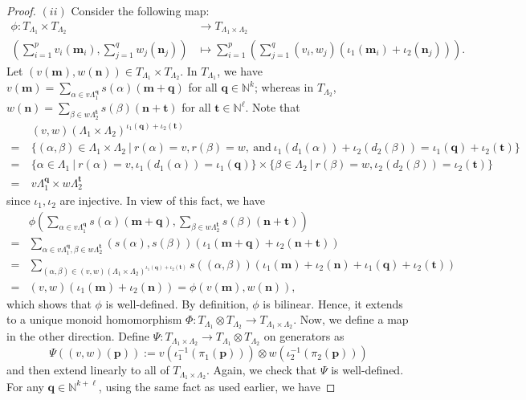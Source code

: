 \documentclass[a4paper,reqno,12pt]{amsart}
\numberwithin{equation}{section}
\theoremstyle{definition}
\theoremstyle{remark}
\newcommand{\N}{\mathbf{n}}
\newcommand{\M}{\mathbf{m}}
\begin{document}
\begin{proof}
$(ii)$ Consider the following map: 
\begin{align*}
\phi:T_{\Lambda_1}\times T_{\Lambda_2}&\longrightarrow T_{\Lambda_1\times \Lambda_2}\\
\left(\displaystyle{\sum_{i=1}^{p}} v_i(\M_i),\displaystyle{\sum_{j=1}^{q}} w_j(\N_j)\right)&\longmapsto \displaystyle{\sum_{i=1}^{p}}\left(\displaystyle{\sum_{j=1}^{q}} (v_i,w_j)(\iota_1(\M_i)+\iota_2(\N_j))\right).
\end{align*}
Let $(v(\M),w(\N))\in T_{\Lambda_1}\times T_{\Lambda_2}$. In $T_{\Lambda_1}$, we have $v(\M)=\displaystyle{\sum_{\alpha\in v\Lambda_1^{\mathbf{q}}}} s(\alpha)(\M+\mathbf{q})$ for all $\mathbf{q}\in \mathbb{N}^k$; whereas in $T_{\Lambda_2}$, $w(\N)=\displaystyle{\sum_{\beta\in w\Lambda_2^{\mathbf{t}}}} s(\beta)(\N+\mathbf{t})$ for all $\mathbf{t}\in \mathbb{N}^\ell$. Note that 
\begin{align*}
&~(v,w)(\Lambda_1\times \Lambda_2)^{\iota_1(\mathbf{q})+\iota_2(\mathbf{t})}\\
=&~\{(\alpha,\beta)\in \Lambda_1\times \Lambda_2~|~r(\alpha)=v,r(\beta)=w,~\text{and}~\iota_1(d_1(\alpha))+\iota_2(d_2(\beta))=\iota_1(\mathbf{q})+\iota_2(\mathbf{t})\}\\
=&~\{\alpha\in \Lambda_1~|~r(\alpha)=v,\iota_1(d_1(\alpha))=\iota_1(\mathbf{q})\}\times \{\beta\in \Lambda_2~|~r(\beta)=w,\iota_2(d_2(\beta))=\iota_2(\mathbf{t})\}\\
=&~v\Lambda_1^{\mathbf{q}}\times w\Lambda_2^{\mathbf{t}}
\end{align*} since $\iota_1,\iota_2$ are injective. In view of this fact, we have 
\begin{align*}
&\phi\left(\displaystyle{\sum_{\alpha\in v\Lambda_1^{\mathbf{q}}}} s(\alpha)(\M+\mathbf{q}),\displaystyle{\sum_{\beta\in w\Lambda_2^{\mathbf{t}}}} s(\beta)(\N+\mathbf{t})\right)\\
=&\displaystyle{\sum_{\alpha\in v\Lambda_1^{\mathbf{q}},\beta\in w\Lambda_2^{\mathbf{t}}}} (s(\alpha),s(\beta))(\iota_1(\M+\mathbf{q})+\iota_2(\N+\mathbf{t}))\\
=&\displaystyle{\sum_{(\alpha,\beta)\in (v,w)(\Lambda_1\times \Lambda_2)^{\iota_1(\mathbf{q})+\iota_2(\mathbf{t})}}} s((\alpha,\beta))(\iota_1(\M)+\iota_2(\N)+\iota_1(\mathbf{q})+\iota_2(\mathbf{t}))\\
=&(v,w)(\iota_1(\M)+\iota_2(\N))=\phi(v(\M),w(\N)), 
\end{align*}
which shows that $\phi$ is well-defined. By definition, $\phi$ is bilinear. Hence, it extends to a unique monoid homomorphism $\Phi:T_{\Lambda_1}\otimes T_{\Lambda_2}\longrightarrow T_{\Lambda_1\times \Lambda_2}$. Now, we define a map in the other direction. Define $\Psi:T_{\Lambda_1\times \Lambda_2}\longrightarrow T_{\Lambda_1}\otimes T_{\Lambda_2}$ on generators as \[\Psi((v,w)(\mathbf{p})):=v(\iota_1^{-1}(\pi_1(\mathbf{p})))\otimes w(\iota_2^{-1}(\pi_2(\mathbf{p})))\] and then extend linearly to all of $T_{\Lambda_1\times \Lambda_2}$. Again, we check that $\Psi$ is well-defined. For any $\mathbf{q}\in \mathbb{N}^{k+\ell}$, using the same fact as used earlier, we have

\end{proof}
\end{document}
